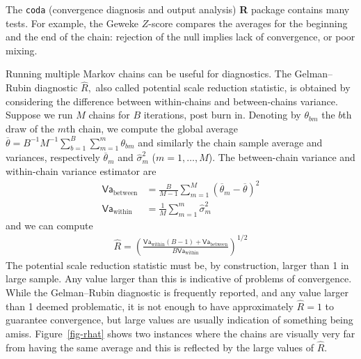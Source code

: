 \documentclass[
  11pt,
  letterpaper,
]{scrbook}
\theoremstyle{definition}
\theoremstyle{plain}
\theoremstyle{plain}
\theoremstyle{definition}
\theoremstyle{definition}
\theoremstyle{remark}
\begin{document}
The \texttt{coda} (convergence diagnosis and output analysis) \textbf{R}
package contains many tests. For example, the Geweke \(Z\)-score
compares the averages for the beginning and the end of the chain:
rejection of the null implies lack of convergence, or poor mixing.

Running multiple Markov chains can be useful for diagnostics. The
Gelman--Rubin diagnostic \(\widehat{R},\) also called potential scale
reduction statistic, is obtained by considering the difference between
within-chains and between-chains variance. Suppose we run \(M\) chains
for \(B\) iterations, post burn in. Denoting by \(\theta_{bm}\) the
\(b\)th draw of the \(m\)th chain, we compute the global average
\(\overline{\theta} = B^{-1}M^{-1}\sum_{b=1}^B \sum_{m=1}^m \theta_{bm}\)
and similarly the chain sample average and variances, respectively
\(\overline{\theta}_m\) and \(\widehat{\sigma}^2_m\)
(\(m=1, \ldots, M\)). The between-chain variance and within-chain
variance estimator are \begin{align*}
\mathsf{Va}_{\text{between}} &= \frac{B}{M-1}\sum_{m=1}^M (\overline{\theta}_m - \overline{\theta})^2\\
\mathsf{Va}_{\text{within}} &= \frac{1}{M}\sum_{m=1}^m \widehat{\sigma}^2_m
\end{align*} and we can compute \begin{align*}
\widehat{R} = \left(\frac{\mathsf{Va}_{\text{within}}(B-1) + \mathsf{Va}_{\text{between}}}{B\mathsf{Va}_{\text{within}}}\right)^{1/2}
\end{align*} The potential scale reduction statistic must be, by
construction, larger than 1 in large sample. Any value larger than this
is indicative of problems of convergence. While the Gelman--Rubin
diagnostic is frequently reported, and any value larger than 1 deemed
problematic, it is not enough to have approximately \(\widehat{R}=1\) to
guarantee convergence, but large values are usually indication of
something being amiss. Figure~\ref{fig-rhat} shows two instances where
the chains are visually very far from having the same average and this
is reflected by the large values of \(\widehat{R}.\)
\end{document}
